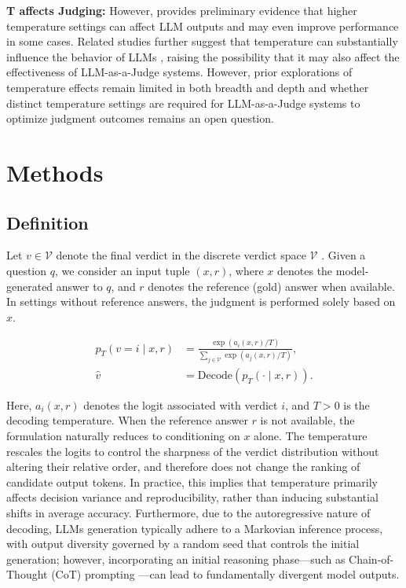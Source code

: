 \documentclass[11pt]{article}
\begin{document}
\noindent \textbf{T affects Judging:}  However, \citeauthor{LI2025242} provides preliminary evidence that higher temperature settings can affect LLM outputs and may even improve performance in some cases. Related studies further suggest that temperature can substantially influence the behavior of LLMs \cite{renze-2024-effect, deepseek_api_temp_2026}, raising the possibility that it may also affect the effectiveness of LLM-as-a-Judge systems. However, prior explorations of temperature effects remain limited in both breadth and depth and whether distinct temperature settings are required for LLM-as-a-Judge systems to optimize judgment outcomes remains an open question.



\section{Methods}

\subsection{Definition}

Let \( v \in \mathcal{V} \) denote the final verdict in the discrete verdict space \( \mathcal{V} \) \cite{ACKLEY1985147}.
Given a question \( q \), we consider an input tuple \( (x, r) \), where \( x \) denotes the model-generated answer to \( q \), and \( r \) denotes the reference (gold) answer when available. In settings without reference answers, the judgment is performed solely based on \( x \).

\begin{equation}
\begin{aligned}
p_T(v = i \mid x, r)
&= \frac{\exp\!\left(a_i(x, r)/T\right)}
{\sum_{j \in \mathcal{V}} \exp\!\left(a_j(x, r)/T\right)}, \\
\hat{v}
&= \mathrm{Decode}\!\left(p_T(\cdot \mid x, r)\right).
\end{aligned}
\end{equation}

Here, \( a_i(x, r) \) denotes the logit associated with verdict \( i \), and \( T > 0 \) is the decoding temperature. When the reference answer \( r \) is not available, the formulation naturally reduces to conditioning on \( x \) alone. The temperature rescales the logits to control the sharpness of the verdict distribution without altering their relative order, and therefore does not change the ranking of candidate output tokens. In practice, this implies that temperature primarily affects decision variance and reproducibility, rather than inducing substantial shifts in average accuracy. Furthermore, due to the autoregressive nature of decoding, LLMs generation typically adhere to a Markovian inference process\cite{zhang2026markovcategoricalframeworklanguage}, with output diversity governed by a random seed 
that controls the initial generation; however, incorporating an initial reasoning 
phase—such as Chain-of-Thought (CoT) prompting \citep{DBLP:journals/corr/abs-2201-11903}—can lead to fundamentally divergent 
model outputs.
\end{document}
